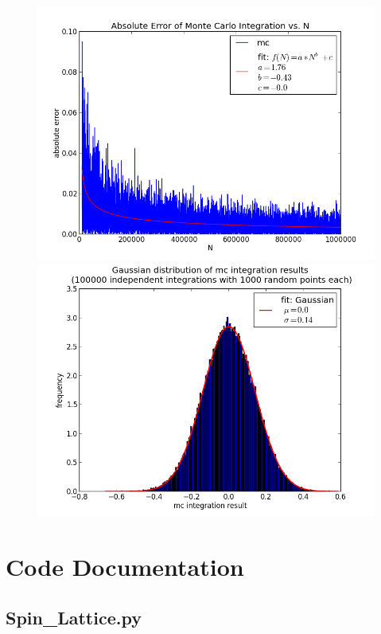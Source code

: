 \documentclass[12pt,a4paper,titlepage]{article}
\begin{document}
\begin{appendix}
\begin{figure}
\begin{minipage}[b]{\linewidth}
		\includegraphics[width=\linewidth]{Plots/sin}
	\end{minipage}
	\begin{minipage}[b]{\linewidth}
		\centering
		\includegraphics[width=\linewidth]{Plots/sin_hist}
	\end{minipage}
	\label{fig:linear}
\end{figure}
\newpage

\section*{Code Documentation}
\subsection*{Spin\_Lattice.py}
{\fontsize{10}{10}

	\begin{alltt}
		
	\end{alltt}
}
\end{appendix}
\end{document}

